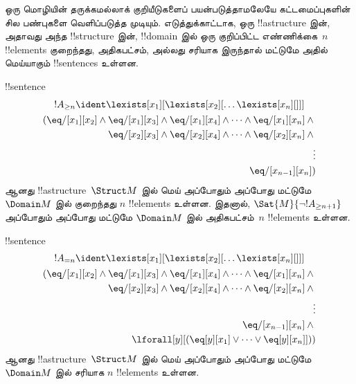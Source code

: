 \documentclass[../../../include/open-logic-section]{subfiles}
\begin{document}



\begin{explain}
ஒரு மொழியின் தருக்கமல்லாக் குறியீடுகளைப் பயன்படுத்தாமலேயே
கட்டமைப்புகளின் சில பண்புகளை வெளிப்படுத்த முடியும். எடுத்துக்காட்டாக,
ஒரு !!a{structure} இன், அதாவது அந்த !!{structure} இன், !!{domain} இல்
ஒரு குறிப்பிட்ட எண்ணிக்கை~$n$
!!{element}s குறைந்தது, அதிகபட்சம், அல்லது சரியாக இருந்தால் மட்டுமே
அதில் மெய்யாகும் !!{sentence}s உள்ளன.
\end{explain}

\begin{prop}
!!{sentence}
\begin{multline*}
  !A_{\ge n} \ident \lexists[x_1][\lexists[x_2][\dots\lexists[x_n][{}]]]\\
  \begin{aligned}
  (\eq/[x_1][x_2] \land {}
  \eq/[x_1][x_3] \land \eq/[x_1][x_4] \land \dots \land \eq/[x_1][x_n] \land {}\\
\eq/[x_2][x_3] \land \eq/[x_2][x_4] \land \dots \land {} \eq/[x_2][x_n] \land {} \\
\vdots\\
\eq/[x_{n-1}][x_n])
\end{aligned}
\end{multline*}
ஆனது !!a{structure}~$\Struct M$ இல் மெய் அப்போதும் அப்போது மட்டுமே $\Domain M$ இல் குறைந்தது
$n$ !!{element}s உள்ளன. இதனால், $\Sat{M}{\lnot !A_{\ge n+1}}$ அப்போதும் அப்போது மட்டுமே
$\Domain M$ இல் அதிகபட்சம்~$n$ !!{element}s உள்ளன.

\end{prop}

\begin{prop}
!!{sentence}
\begin{multline*}
!A_{= n} \ident \lexists[x_1][\lexists[x_2][\dots\lexists[x_n][{}]]] \\
\begin{aligned}
  (\eq/[x_1][x_2] \land {}
  \eq/[x_1][x_3] \land \eq/[x_1][x_4] \land \dots \land \eq/[x_1][x_n] \land {}\\
\eq/[x_2][x_3] \land \eq/[x_2][x_4] \land \dots \land {} \eq/[x_2][x_n] \land {} \\
\vdots\\
\eq/[x_{n-1}][x_n] \land {} \\
\lforall[y][(\eq[y][x_1] \lor \dots \lor \eq[y][x_n]]))
\end{aligned}
\end{multline*}
ஆனது !!a{structure}~$\Struct M$ இல் மெய் அப்போதும் அப்போது மட்டுமே $\Domain M$ இல் சரியாக
$n$ !!{element}s உள்ளன.
\end{prop}
\end{document}
